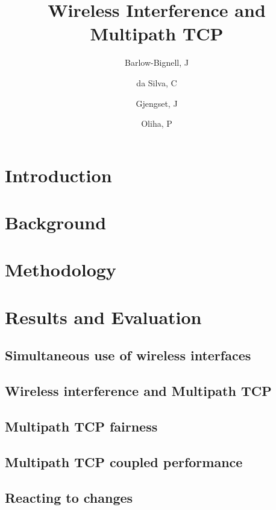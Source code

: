 \documentclass[12pt,a4paper]{article}
\title{Wireless Interference and Multipath TCP}
\author{Barlow-Bignell, J}
\author{da Silva, C}
\author{Gjengset, J}
\author{Oliha, P}
\affil{University College London}
\date{}
\begin{document}
\maketitle

\begin{abstract}
 
\end{abstract}
\clearpage

\section{Introduction}

\FloatBarrier

\section{Background}

\FloatBarrier

\section{Methodology}

\FloatBarrier

\section{Results and Evaluation}

\subsection{Simultaneous use of wireless interfaces}
\label{sec:results-interference}

\FloatBarrier
\subsection{Wireless interference and Multipath TCP}
\label{sec:results-mptcp}

\FloatBarrier
\subsection{Multipath TCP fairness}
\label{sec:results-fairness}

\FloatBarrier
\subsection{Multipath TCP coupled performance}
\label{sec:results-performance}

\FloatBarrier
\subsection{Reacting to changes}
\label{sec:results-reacting}

\FloatBarrier
\end{document}
